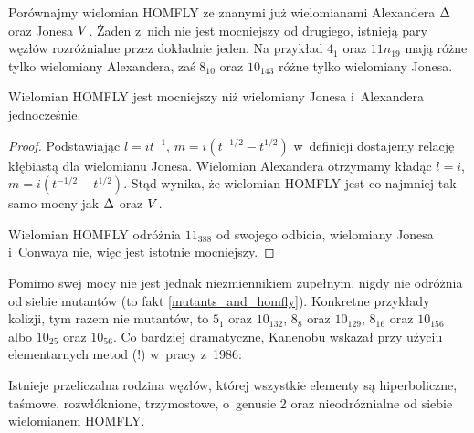 Porównajmy wielomian HOMFLY ze znanymi już wielomianami Alexandera $\Delta$ oraz Jonesa $V$.
Żaden z~nich nie jest mocniejszy od drugiego, istnieją pary węzłów rozróżnialne przez dokładnie jeden.
Na przykład $4_1$ oraz $11n_{19}$ mają różne tylko wielomiany Alexandera, zaś $8_{10}$ oraz $10_{143}$ różne tylko wielomiany Jonesa.

\begin{proposition}
\label{homfly_stronger}%
    Wielomian HOMFLY jest mocniejszy niż wielomiany Jonesa i~Alexandera jednocześnie.
\end{proposition}

\begin{proof}
    Podstawiając $l = it^{-1}$, $m = i(t^{-1/2} - t^{1/2})$ w~definicji dostajemy relację kłębiastą dla wielomianu Jonesa.
    Wielomian Alexandera otrzymamy kładąc $l = i$, $m = i(t^{-1/2} - t^{1/2})$.
    Stąd wynika, że wielomian HOMFLY jest co najmniej tak samo mocny jak $\Delta$ oraz $V$.

    Wielomian HOMFLY odróżnia $11_{388}$ od swojego odbicia, wielomiany Jonesa i~Conwaya nie, więc jest istotnie mocniejszy.
\end{proof}

Pomimo swej mocy nie jest jednak niezmiennikiem zupełnym, nigdy nie odróżnia od siebie mutantów (to fakt \ref{mutants_and_homfly}).
%
Konkretne przykłady kolizji, tym razem nie mutantów, to $5_1$ oraz $10_{132}$, $8_{8}$ oraz $10_{129}$, $8_{16}$ oraz $10_{156}$ albo $10_{25}$ oraz $10_{56}$.
Co bardziej dramatyczne, Kanenobu wskazał przy użyciu elementarnych metod (!) w~pracy \cite{kanenobu1986} z~1986:
%

\begin{proposition}
%
%
%
%
%
    Istnieje przeliczalna rodzina węzłów, której wszystkie elementy są hiperboliczne, taśmowe, rozwłóknione, trzymostowe, o~genusie 2 oraz nieodróżnialne od siebie wielomianem HOMFLY.
\end{proposition}

